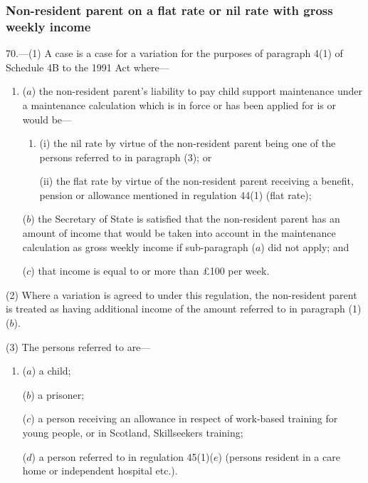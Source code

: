 \documentclass[12pt,a4paper]{article}
\begin{document}

\subsubsection[70. Non-resident parent on a flat rate or nil rate with gross weekly income]{Non-resident parent on a flat rate or nil rate with gross weekly income}

70.---(1)  A case is a case for a variation for the purposes of paragraph 4(1) of Schedule 4B to the 1991 Act where—
\begin{enumerate}\item[]
($a$) the non-resident parent’s liability to pay child support maintenance under a maintenance calculation which is in force or has been applied for is or would be—
\begin{enumerate}\item[]
(i) the nil rate by virtue of the non-resident parent being one of the persons referred to in paragraph (3); or

(ii) the flat rate by virtue of the non-resident parent receiving a benefit, pension or allowance mentioned in regulation 44(1) (flat rate);
\end{enumerate}

($b$) the Secretary of State is satisfied that the non-resident parent has an amount of income that would be taken into account in the maintenance calculation as gross weekly income if sub-paragraph ($a$)  did not apply; and

($c$) that income is 
equal to or  %
more than £100 per week.
\end{enumerate}

(2) Where a variation is agreed to under this regulation, the non-resident parent is treated as having additional income of the amount referred to in paragraph (1)($b$).

(3) The persons referred to are—
\begin{enumerate}\item[]
($a$) a child;

($b$) a prisoner;

($c$) a person receiving an allowance in respect of work-based training for young people, or in Scotland, Skillseekers training;

($d$) a person referred to in regulation 45(1)($e$)  (persons resident in a care home or independent hospital etc.).
\end{enumerate}
\end{document}
